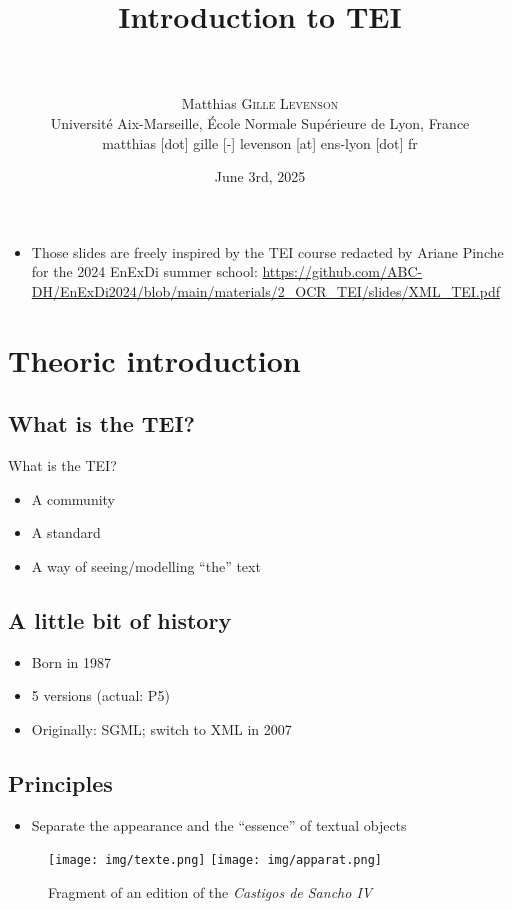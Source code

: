 \documentclass[11pt,aspectratio=1610]{beamer}
\date[June 2nd, 2025]{June 3rd, 2025}
\author[Matthias \textsc{Gille Levenson}]{\\~\\ Matthias \textsc{Gille Levenson}\\   {\scriptsize Université Aix-Marseille, École Normale Supérieure de Lyon, France}\\ {\tiny matthias [dot] gille [-] levenson [at] ens-lyon [dot] fr}\vspace{-1cm}}
\title[Introduction to TEI]{Introduction to TEI}
\begin{document}
\maketitle

\begin{frame}
\begin{itemize}
\item Those slides are freely inspired by the TEI course redacted by Ariane Pinche for the 2024 EnExDi summer school: \url{https://github.com/ABC-DH/EnExDi2024/blob/main/materials/2_OCR_TEI/slides/XML_TEI.pdf}
\end{itemize}
\end{frame}

\section{Theoric introduction}

\subsection{What is the TEI?}
\begin{frame}{What is the TEI?}
\begin{itemize}
\item A community 
\item A standard
\item A way of seeing/modelling \enquote{the} text
\end{itemize}
\end{frame}

\subsection{A little bit of history}
\begin{frame}{}
\begin{itemize}
\item Born in 1987
\item 5 versions (actual: P5)
\item Originally: SGML; switch to XML in 2007
\end{itemize}
\end{frame}

\subsection{Principles}
\begin{frame}{}
\begin{itemize}
\item Separate the appearance and the \enquote{essence} of textual objects
\end{itemize}
\begin{center}
\begin{figure}
\texttt{[image: img/texte.png]}
\texttt{[image: img/apparat.png]}
\caption{Fragment of an edition of the \textit{Castigos de Sancho IV}}
\end{figure}
\end{center}
\end{frame}
\end{document}
